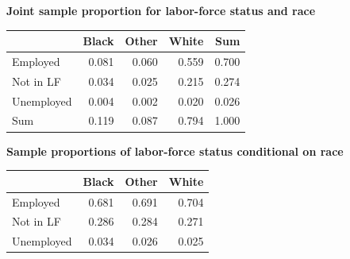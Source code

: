 \documentclass[
  letterpaper,
  DIV=11,
  numbers=noendperiod]{scrartcl}
\newenvironment{Shaded}{\begin{snugshade}}{\end{snugshade}}
\newcommand{\AttributeTok}[1]{\textcolor[rgb]{0.40,0.45,0.13}{#1}}
\newcommand{\DecValTok}[1]{\textcolor[rgb]{0.68,0.00,0.00}{#1}}
\newcommand{\FunctionTok}[1]{\textcolor[rgb]{0.28,0.35,0.67}{#1}}
\newcommand{\NormalTok}[1]{\textcolor[rgb]{0.00,0.23,0.31}{#1}}
\newcommand{\OtherTok}[1]{\textcolor[rgb]{0.00,0.23,0.31}{#1}}
\newcommand{\SpecialCharTok}[1]{\textcolor[rgb]{0.37,0.37,0.37}{#1}}
\newcommand{\StringTok}[1]{\textcolor[rgb]{0.13,0.47,0.30}{#1}}
\begin{document}
\textbf{Joint sample proportion for labor-force status and race}

\begin{Shaded}
\end{Shaded}

\begin{table}
\centering
\begin{tabular}[t]{lrrrr}
\toprule
  & Black & Other & White & Sum\\
\midrule
Employed & 0.081 & 0.060 & 0.559 & 0.700\\
Not in LF & 0.034 & 0.025 & 0.215 & 0.274\\
Unemployed & 0.004 & 0.002 & 0.020 & 0.026\\
Sum & 0.119 & 0.087 & 0.794 & 1.000\\
\bottomrule
\end{tabular}
\end{table}

\textbf{Sample proportions of labor-force status conditional on race}

\begin{Shaded}
\end{Shaded}

\begin{table}
\centering
\begin{tabular}[t]{lrrr}
\toprule
  & Black & Other & White\\
\midrule
Employed & 0.681 & 0.691 & 0.704\\
Not in LF & 0.286 & 0.284 & 0.271\\
Unemployed & 0.034 & 0.026 & 0.025\\
\bottomrule
\end{tabular}
\end{table}
\end{document}
